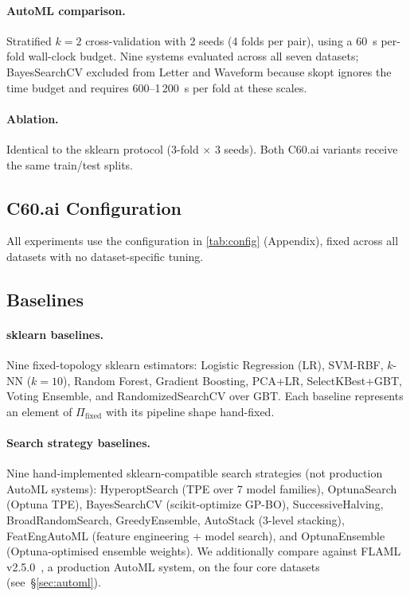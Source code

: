 \documentclass{article}
\theoremstyle{definition}
\theoremstyle{plain}
\theoremstyle{remark}
\begin{document}
\paragraph{AutoML comparison.}
Stratified $k=2$ cross-validation with 2 seeds (4 folds per pair),
using a 60~s per-fold wall-clock budget.
Nine systems evaluated across all seven datasets;
BayesSearchCV excluded from Letter and Waveform because skopt ignores the
time budget and requires 600--1\,200~s per fold at these scales.

\paragraph{Ablation.}
Identical to the sklearn protocol (3-fold $\times$ 3 seeds).
Both C60.ai variants receive the same train/test splits.

\subsection{C60.ai Configuration}

All experiments use the configuration in \cref{tab:config} (Appendix),
fixed across all datasets with no dataset-specific tuning.

\subsection{Baselines}

\paragraph{sklearn baselines.}
Nine fixed-topology sklearn estimators: Logistic Regression (LR), SVM-RBF,
$k$-NN ($k{=}10$), Random Forest, Gradient Boosting, PCA+LR, SelectKBest+GBT,
Voting Ensemble, and RandomizedSearchCV over GBT.
Each baseline represents an element of $\Pi_{\mathrm{fixed}}$ with its
pipeline shape hand-fixed.

\paragraph{Search strategy baselines.}
Nine hand-implemented sklearn-compatible search strategies (not
production AutoML systems):
HyperoptSearch (TPE over 7 model families),
OptunaSearch (Optuna TPE),
BayesSearchCV (scikit-optimize GP-BO),
SuccessiveHalving,
BroadRandomSearch,
GreedyEnsemble,
AutoStack (3-level stacking),
FeatEngAutoML (feature engineering + model search), and
OptunaEnsemble (Optuna-optimised ensemble weights).
We additionally compare against FLAML v2.5.0~\citep{wang2021flaml}, a
production AutoML system, on the four core datasets (see~\S\ref{sec:automl}).
\end{document}
